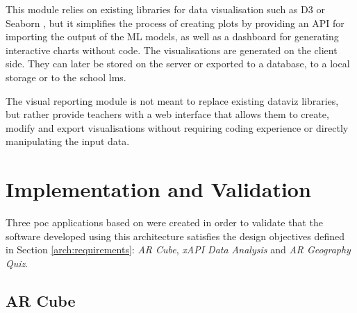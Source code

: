 
This module relies on existing libraries for data visualisation such as D3 \citep{10.1109/TVCG.2011.185} or Seaborn \citep{Waskom2021}, but it simplifies the process of creating plots by providing an API for importing the output of the ML models, as well as a dashboard for generating interactive charts without code. %
The visualisations are generated on the client side. They can later be stored on the server or exported to a database, to a local storage or to the school \gls{lms}.

The visual reporting module is not meant to replace existing dataviz libraries, but rather provide teachers with a web interface that allows them to create, modify and export visualisations without requiring coding experience or directly manipulating the input data.


\section{Implementation and Validation}\label{arch:implementation}

Three \gls{poc} applications based on \arch{} were created in order to validate that the software developed using this architecture satisfies the design objectives defined in Section \ref{arch:requirements}: \emph{AR Cube}, \emph{xAPI Data Analysis} and \emph{AR Geography Quiz}.

\subsection{AR Cube}

